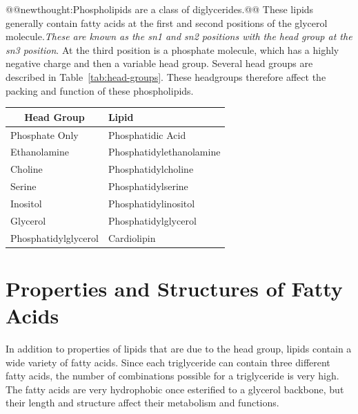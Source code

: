 \documentclass{tufte-handout}
\makeatletter
\def\newthought#1{@@newthought:#1@@}
\makeatother
\begin{document}
\newthought{Phospholipids are a class of diglycerides.}  These lipids generally contain fatty acids at the first and second positions of the glycerol molecule.\emph{These are known as the sn1 and sn2 positions with the head group at the sn3 position}.  At the third position is a phosphate molecule, which has a highly negative charge and then a variable head group.  Several head groups are described in Table~\ref{tab:head-groups}.  These headgroups therefore affect the packing and function of these phospholipids.  

\begin{margintable}
\centering
\caption{Common phospholipid head groups.  Note that for Phosphatidylglycerol there is a \emph{second} glycerol headgroup in addition to the one conjugated to the fatty acids.  For Cardiolipin, there is another entire phosphatidylglycerol molecule, meaning there are two glycerol molecules, and four fatty acids linked via the phosphate group.}\label{tab:head-groups}
\begin{tabular}{ll}
\hline
\multicolumn{1}{c}{\textbf{Head Group}} & \textbf{Lipid} \\ \hline
Phosphate Only          & Phosphatidic Acid      \\
Ethanolamine           & Phosphatidylethanolamine           \\
Choline           & Phosphatidylcholine          \\
Serine        & Phosphatidylserine \\
Inositol & Phosphatidylinositol \\
Glycerol & Phosphatidylglycerol \\
Phosphatidylglycerol & Cardiolipin     
\end{tabular}
\end{margintable}

\section{Properties and Structures of Fatty Acids}

In addition to properties of lipids that are due to the head group, lipids contain a wide variety of fatty acids.  Since each triglyceride can contain three different fatty acids, the number of combinations possible for a triglyceride is very high.  The fatty acids are very hydrophobic once esterified to a glycerol backbone, but their length and structure affect their metabolism and functions.
\end{document}

